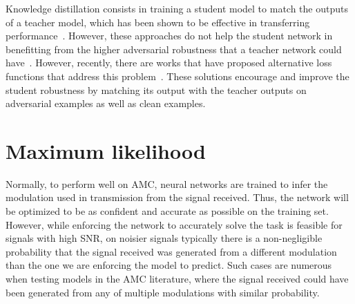 \documentclass[conference]{IEEEtran}
\begin{document}
Knowledge distillation consists in training a student model to match the outputs of a teacher model, which has been shown to be effective in transferring performance~\cite{hinton2015distilling,romero2014fitnets,zagoruyko2016paying,chebotar2016distilling}. However, these approaches do not help the student network in benefitting from the higher adversarial robustness that a teacher network could have~\cite{goldblum2020adversarially}. However, recently, there are works that have proposed alternative loss functions that address this problem~\cite{goldblum2020adversarially,zi2021revisiting,zhu2021reliable,shao2021and,maroto2022benefits}. These solutions encourage and improve the student robustness by matching its output with the teacher outputs on adversarial examples as well as clean examples.

\section{Maximum likelihood}

Normally, to perform well on AMC, neural networks are trained to infer the modulation used in transmission from the signal received. Thus, the network will be optimized to be as confident and accurate as possible on the training set. However, while enforcing the network to accurately solve the task is feasible for signals with high SNR, on noisier signals typically there is a non-negligible probability that the signal received was generated from a different modulation than the one we are enforcing the model to predict. Such cases are numerous when testing models in the AMC literature, where the signal received could have been generated from any of multiple modulations with similar probability.
\end{document}
